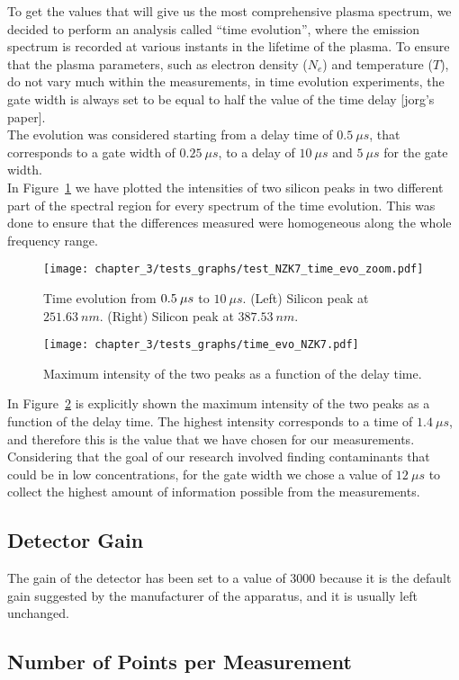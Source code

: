 To get the values that will give us the most comprehensive plasma spectrum, we decided to perform an analysis called “time evolution”, where the emission spectrum is recorded at various instants in the lifetime of the plasma. To ensure that the plasma parameters, such as electron density ($N_e$) and temperature ($T$), do not vary much within the measurements, in time evolution experiments, the gate width is always set to be equal to half the value of the time delay [jorg’s paper].
\\
The evolution was considered starting from a delay time of $0.5\: \mu s$, that corresponds to a gate width of $0.25 \: \mu s$, to a delay of $10 \: \mu s$ and $5 \: \mu s$ for the gate width.
\\
In Figure~\ref{fig:test_NZK7_time_evo_zoom} we have plotted the intensities of two silicon peaks in two different part of the spectral region for every spectrum of the time evolution. This was done to ensure that the differences measured were homogeneous along the whole frequency range.
\begin{figure}[H]
    \centering
    \texttt{[image: chapter\_3/tests\_graphs/test\_NZK7\_time\_evo\_zoom.pdf]} 
    \vspace*{-30pt}
    \caption[Time evolution.]{Time evolution from $\protect 0.5\: \mu s$ to $10 \: \mu s$. (Left) Silicon peak at $251.63 \: nm$. (Right) Silicon peak at $387.53 \: nm$.}
    \label{fig:test_NZK7_time_evo_zoom}
 \end{figure}

 \begin{figure}[H]
    \centering
    \texttt{[image: chapter\_3/tests\_graphs/time\_evo\_NZK7.pdf]} 
    \vspace*{-30pt}
    \caption{Maximum intensity of the two peaks as a function of the delay time.}
    \label{fig:time_evo_NZK7}
 \end{figure}
In Figure~\ref{fig:time_evo_NZK7} is explicitly shown the maximum intensity of the two peaks as a function of the delay time. The highest intensity corresponds to a time of $1.4 \: \mu s$, and therefore this is the value that we have chosen for our measurements.
\\
Considering that the goal of our research involved finding contaminants that could be in low concentrations, for the gate width we chose a value of $12 \: \mu s$ to collect the highest amount of information possible from the measurements.

\subsection{Detector Gain}
\label{subsec:detector_gain}
The gain of the detector has been set to a value of 3000 because it is the default gain suggested by the manufacturer of the apparatus, and it is usually left unchanged.

\subsection{Number of Points per Measurement}
\label{subsec:number_points_mesurement}